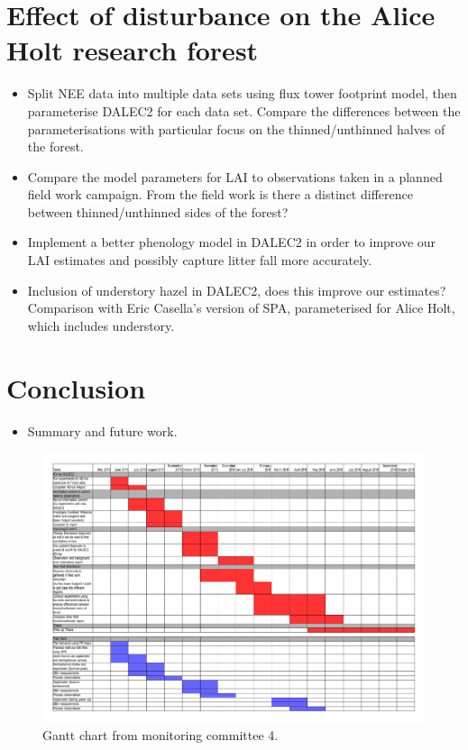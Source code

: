 \documentclass[11pt]{article}
\begin{document}
\section{Effect of disturbance on the Alice Holt research forest}
\begin{itemize}
\item Split NEE data into multiple data sets using flux tower footprint model, then parameterise DALEC2 for each data set. Compare the differences between the parameterisations with particular focus on the thinned/unthinned halves of the forest.
\item Compare the model parameters for LAI to observations taken in a planned field work campaign. From the field work is there a distinct difference between thinned/unthinned sides of the forest?
\item Implement a better phenology model in DALEC2 in order to improve our LAI estimates and possibly capture litter fall more accurately.
\item Inclusion of understory hazel in DALEC2, does this improve our estimates? Comparison with Eric Casella's version of SPA, parameterised for Alice Holt, which includes understory.
\end{itemize}


\section{Conclusion}
\begin{itemize}
\item Summary and future work.
\end{itemize}

\begin{figure}
    \includegraphics[width=1.\textwidth]{gantt.pdf}
    \caption{Gantt chart from monitoring committee 4.}
    \label{fig:PropProf}
\end{figure}
\end{document}
